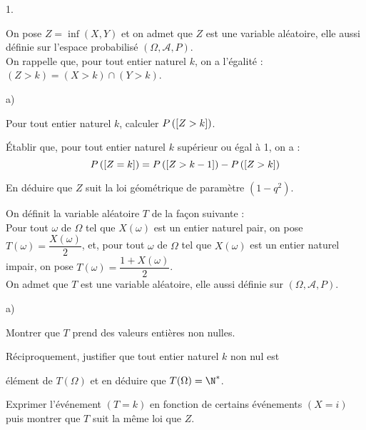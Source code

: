 \documentclass[11pt]{article}%
\begin{document}
\begin{noliste}{1.}
 \setlength{\itemsep}{4mm}
\item On pose $Z = \inf (X,Y)$ et on admet que $Z$ est une variable
aléatoire, elle aussi définie sur l'espace probabilisé
$(\Omega,\mathcal{A},P)$.\\
On rappelle que, pour tout entier naturel $k$, on a l'égalité : $(Z>k)
= (X>k)\cap (Y>k)$.

\begin{noliste}{a)}
 \setlength{\itemsep}{2mm}
\item Pour tout entier naturel $k$, calculer $P\left(\left[ {Z>k} \right]\right)$.

\item Établir que, pour tout entier naturel $k$ supérieur ou égal 
à 1, on a :
\[
P\left(\left[ {Z = k} \right]\right) =
P\left(\left[ {Z>k-1} \right]\right)-P\left(\left[ {Z>k} \right]\right)
\]

\item En déduire que $Z$ suit la loi géométrique de paramètre
$(1-q^{2})$.
\end{noliste}

\item On définit la variable aléatoire $T$ de la façon suivante :\\
Pour tout $\omega $ de $\Omega $ tel que $X(\omega )$ est un entier
naturel
pair, on pose $T(\omega ) = \dfrac{X(\omega )}{2}$, et, pour tout
$\omega $ de 
$\Omega $ tel que $X(\omega )$ est un entier naturel impair, on pose
$T(\omega ) = \dfrac{1 + X(\omega )}{2}$.\\
On admet que $T$ est une variable aléatoire, elle aussi définie sur
$(\Omega,\mathcal{A},P)$.

\begin{noliste}{a)}
 \setlength{\itemsep}{2mm}
\item Montrer que $T$ prend des valeurs entières non nulles.

\item Réciproquement, justifier que tout entier naturel $k$ non nul est

élément de $T(\Omega )$ et en déduire que $T(\Omega ) = \N^{\ast }$.

\item Exprimer l'événement $(T = k)$ en fonction de certains événements
$(X = i)$ puis montrer que $T$ suit la même loi que $Z$.
\end{noliste}


\end{noliste}
\end{document}
